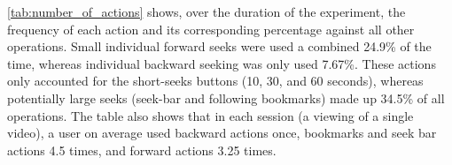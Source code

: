 \begin{table}[t]
 \caption{Interactions observed throughout the experiment}
\label{tab:number_of_actions}
\end{table}

\autoref{tab:number_of_actions} shows, over the duration of the experiment, the frequency of each action and its corresponding percentage against all other operations. Small individual forward seeks were used a combined 24.9\% of the time, whereas individual backward seeking was only used 7.67\%. These actions only accounted for the short-seeks buttons (10, 30, and 60 seconds), whereas potentially large seeks (seek-bar and following bookmarks) made up 34.5\% of all operations. The table also shows that in each session (a viewing of a single video), a user on average used backward actions once, bookmarks and seek bar actions 4.5 times, and forward actions 3.25 times.

